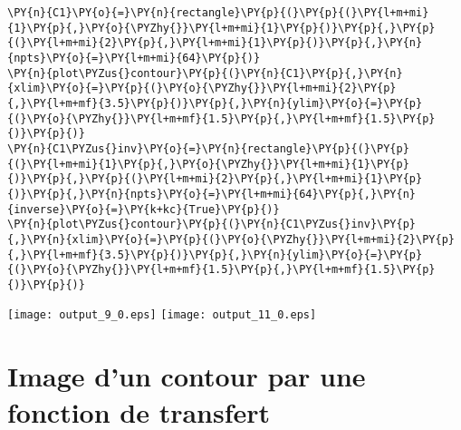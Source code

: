     \begin{tcolorbox}[breakable, size=fbox, boxrule=1pt, pad at break*=1mm,colback=cellbackground, colframe=cellborder]
\begin{Verbatim}[commandchars=\\\{\}]
\PY{n}{C1}\PY{o}{=}\PY{n}{rectangle}\PY{p}{(}\PY{p}{(}\PY{l+m+mi}{1}\PY{p}{,}\PY{o}{\PYZhy{}}\PY{l+m+mi}{1}\PY{p}{)}\PY{p}{,}\PY{p}{(}\PY{l+m+mi}{2}\PY{p}{,}\PY{l+m+mi}{1}\PY{p}{)}\PY{p}{,}\PY{n}{npts}\PY{o}{=}\PY{l+m+mi}{64}\PY{p}{)}
\PY{n}{plot\PYZus{}contour}\PY{p}{(}\PY{n}{C1}\PY{p}{,}\PY{n}{xlim}\PY{o}{=}\PY{p}{(}\PY{o}{\PYZhy{}}\PY{l+m+mi}{2}\PY{p}{,}\PY{l+m+mf}{3.5}\PY{p}{)}\PY{p}{,}\PY{n}{ylim}\PY{o}{=}\PY{p}{(}\PY{o}{\PYZhy{}}\PY{l+m+mf}{1.5}\PY{p}{,}\PY{l+m+mf}{1.5}\PY{p}{)}\PY{p}{)}
\PY{n}{C1\PYZus{}inv}\PY{o}{=}\PY{n}{rectangle}\PY{p}{(}\PY{p}{(}\PY{l+m+mi}{1}\PY{p}{,}\PY{o}{\PYZhy{}}\PY{l+m+mi}{1}\PY{p}{)}\PY{p}{,}\PY{p}{(}\PY{l+m+mi}{2}\PY{p}{,}\PY{l+m+mi}{1}\PY{p}{)}\PY{p}{,}\PY{n}{npts}\PY{o}{=}\PY{l+m+mi}{64}\PY{p}{,}\PY{n}{inverse}\PY{o}{=}\PY{k+kc}{True}\PY{p}{)}
\PY{n}{plot\PYZus{}contour}\PY{p}{(}\PY{n}{C1\PYZus{}inv}\PY{p}{,}\PY{n}{xlim}\PY{o}{=}\PY{p}{(}\PY{o}{\PYZhy{}}\PY{l+m+mi}{2}\PY{p}{,}\PY{l+m+mf}{3.5}\PY{p}{)}\PY{p}{,}\PY{n}{ylim}\PY{o}{=}\PY{p}{(}\PY{o}{\PYZhy{}}\PY{l+m+mf}{1.5}\PY{p}{,}\PY{l+m+mf}{1.5}\PY{p}{)}\PY{p}{)}
\end{Verbatim}
\end{tcolorbox}
\begin{center}
    \texttt{[image: output\_9\_0.eps]}
    \texttt{[image: output\_11\_0.eps]}
\end{center}
\section{Image d'un contour par une fonction de transfert
\label{image-dun-contour-par-une-fonction-de-transfert}}
